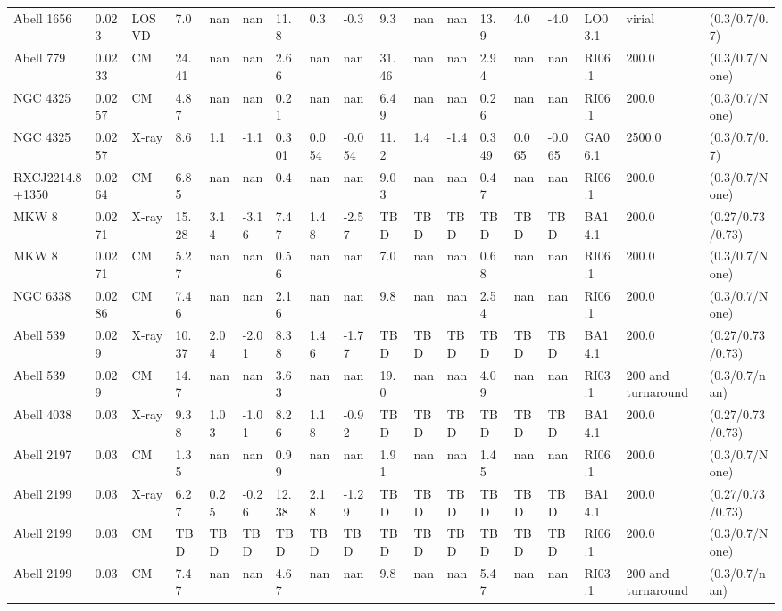 \documentclass{article}
\begin{document}
\begin{center}
\begin{landscape}
\begin{longtable}{llllllllllllllllll}
Abell 1656 & 0.023 & LOSVD & 7.0 & nan & nan & 11.8 & 0.3 & -0.3 & 9.3 & nan & nan & 13.9 & 4.0 & -4.0 & LO03.1 & virial & (0.3/0.7/0.7) \\
Abell 779 & 0.0233 & CM & 24.41 & nan & nan & 2.66 & nan & nan & 31.46 & nan & nan & 2.94 & nan & nan & RI06.1 & 200.0 & (0.3/0.7/None) \\
NGC 4325 & 0.0257 & CM & 4.87 & nan & nan & 0.21 & nan & nan & 6.49 & nan & nan & 0.26 & nan & nan & RI06.1 & 200.0 & (0.3/0.7/None) \\
NGC 4325 & 0.0257 & X-ray & 8.6 & 1.1 & -1.1 & 0.301 & 0.054 & -0.054 & 11.2 & 1.4 & -1.4 & 0.349 & 0.065 & -0.065 & GA06.1 & 2500.0 & (0.3/0.7/0.7) \\
RXCJ2214.8+1350 & 0.0264 & CM & 6.85 & nan & nan & 0.4 & nan & nan & 9.03 & nan & nan & 0.47 & nan & nan & RI06.1 & 200.0 & (0.3/0.7/None) \\
MKW 8 & 0.0271 & X-ray & 15.28 & 3.14 & -3.16 & 7.47 & 1.48 & -2.57 & TBD & TBD & TBD & TBD & TBD & TBD & BA14.1 & 200.0 & (0.27/0.73/0.73) \\
MKW 8 & 0.0271 & CM & 5.27 & nan & nan & 0.56 & nan & nan & 7.0 & nan & nan & 0.68 & nan & nan & RI06.1 & 200.0 & (0.3/0.7/None) \\
NGC 6338 & 0.0286 & CM & 7.46 & nan & nan & 2.16 & nan & nan & 9.8 & nan & nan & 2.54 & nan & nan & RI06.1 & 200.0 & (0.3/0.7/None) \\
Abell 539 & 0.029 & X-ray & 10.37 & 2.04 & -2.01 & 8.38 & 1.46 & -1.77 & TBD & TBD & TBD & TBD & TBD & TBD & BA14.1 & 200.0 & (0.27/0.73/0.73) \\
Abell 539 & 0.029 & CM & 14.7 & nan & nan & 3.63 & nan & nan & 19.0 & nan & nan & 4.09 & nan & nan & RI03.1 & 200 and turnaround & (0.3/0.7/nan) \\
Abell 4038 & 0.03 & X-ray & 9.38 & 1.03 & -1.01 & 8.26 & 1.18 & -0.92 & TBD & TBD & TBD & TBD & TBD & TBD & BA14.1 & 200.0 & (0.27/0.73/0.73) \\
Abell 2197 & 0.03 & CM & 1.35 & nan & nan & 0.99 & nan & nan & 1.91 & nan & nan & 1.45 & nan & nan & RI06.1 & 200.0 & (0.3/0.7/None) \\
Abell 2199 & 0.03 & X-ray & 6.27 & 0.25 & -0.26 & 12.38 & 2.18 & -1.29 & TBD & TBD & TBD & TBD & TBD & TBD & BA14.1 & 200.0 & (0.27/0.73/0.73) \\
Abell 2199 & 0.03 & CM & TBD & TBD & TBD & TBD & TBD & TBD & TBD & TBD & TBD & TBD & TBD & TBD & RI06.1 & 200.0 & (0.3/0.7/None) \\
Abell 2199 & 0.03 & CM & 7.47 & nan & nan & 4.67 & nan & nan & 9.8 & nan & nan & 5.47 & nan & nan & RI03.1 & 200 and turnaround & (0.3/0.7/nan) \\

\end{longtable}
\end{landscape}
\end{center}
\end{document}

